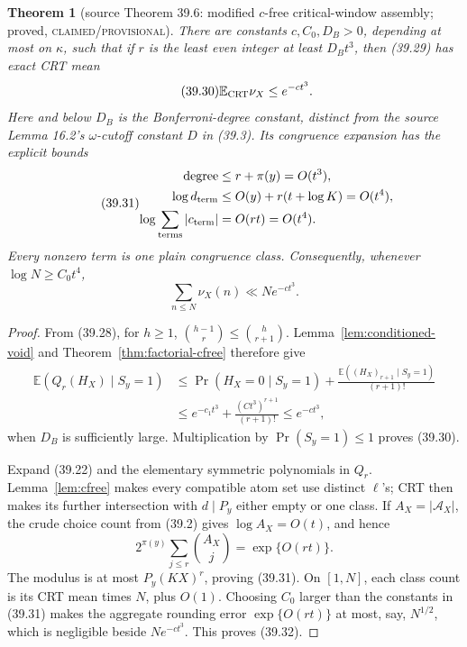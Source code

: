 \documentclass[10pt,reqno]{amsart}
\newtheorem{theorem}{Theorem}[section]
\theoremstyle{definition}
\newcommand{\1}{\mathbf 1}
\begin{document}
\begin{theorem}[source Theorem 39.6: modified $c$-free critical-window
assembly; proved, \textsc{claimed/provisional}]\label{thm:cfree-assembly}
There are constants $c,C_0,D_B>0$, depending at most on $\kappa$, such that
if $r$ is the least even integer at least $D_Bt^3$, then (39.29) has exact
CRT mean
\begin{equation}\tag{39.30}
 \mathbb E_{\rm CRT}\nu_X\leq e^{-ct^3}.
\end{equation}
Here and below $D_B$ is the Bonferroni-degree constant, distinct from the
source Lemma 16.2's $\omega$-cutoff constant $D$ in (39.3).  Its congruence
expansion has the explicit bounds
\begin{equation}\tag{39.31}
 \begin{split}
 \text{degree}&\leq r+\pi(y)=O(t^3),\\
 \log d_{\rm term}&\leq O(y)+r(t+\log K)=O(t^4),\\
 \log\sum_{\rm terms}|c_{\rm term}|&=O(rt)=O(t^4).
 \end{split}
\end{equation}
Every nonzero term is one plain congruence class.  Consequently, whenever
$\log N\geq C_0t^4$,
\begin{equation}\tag{39.32}
 \sum_{n\leq N}\nu_X(n)\ll Ne^{-ct^3}.
\end{equation}
\end{theorem}
\begin{proof}
From (39.28), for $h\geq1$,
$\binom{h-1}r\leq\binom h{r+1}$.  Lemma~\ref{lem:conditioned-void} and
Theorem~\ref{thm:factorial-cfree} therefore give
\begin{equation}\tag{39.33}
 \begin{split}
 \mathbb E(Q_r(H_X)\mid S_y=1)
 &\leq\Pr(H_X=0\mid S_y=1)
       +\frac{\mathbb E((H_X)_{r+1}\mid S_y=1)}{(r+1)!}\\
 &\leq e^{-c_1t^3}+\frac{(Ct^3)^{r+1}}{(r+1)!}
 \leq e^{-ct^3},
 \end{split}
\end{equation}
when $D_B$ is sufficiently large.  Multiplication by
$\Pr(S_y=1)\leq1$ proves (39.30).

Expand (39.22) and the elementary symmetric polynomials in $Q_r$.
Lemma~\ref{lem:cfree} makes every compatible atom set use distinct
$\ell$'s; CRT then makes its further intersection with $d\mid P_y$ either
empty or one class.  If $A_X=|\mathcal A_X|$, the crude choice count from
(39.2) gives $\log A_X=O(t)$, and hence
\begin{equation}\tag{39.34}
 2^{\pi(y)}\sum_{j\leq r}\binom{A_X}j=\exp\{O(rt)\}.
\end{equation}
The modulus is at most $P_y(KX)^r$, proving (39.31).  On $[1,N]$, each
class count is its CRT mean times $N$, plus $O(1)$.  Choosing $C_0$ larger
than the constants in (39.31) makes the aggregate rounding error
$\exp\{O(rt)\}$ at most, say, $N^{1/2}$, which is negligible beside
$Ne^{-ct^3}$.  This proves (39.32).
\end{proof}
\end{document}
